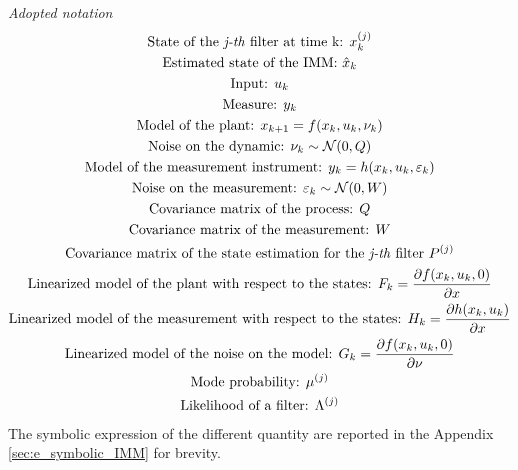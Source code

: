 \textit{Adopted notation}\\
\begin{gather}
  \text{State of the \textit{j-th} filter at time k: } x^{(j)}_{k}  \\
  \text{Estimated state of the IMM: } \hat{x}_{k}\\
  \text{Input: } u_{k} \\
  \text{Measure: } y_{k} \\
  \text{Model of the plant: }  x_{k+1} = f(x_k, u_k, \nu_k) \\
  \text{Noise on the dynamic: } \nu_k \sim \mathcal{N}(0, Q) \\ \label{eq:noise_Q}
  \text{Model of the measurement instrument: } y_k = h(x_k, u_k, \varepsilon_k) \\
  \text{Noise on the measurement: } \varepsilon_k \sim \mathcal{N}(0, W)  \\
  \text{Covariance matrix of the process: } Q\\
  \text{Covariance matrix of the measurement: } W \\
  \text{Covariance matrix of the state estimation for the \textit{j-th} filter } P^{(j)}\\
  \text{Linearized model of the plant with respect to the states: } F_k = \frac{\partial f(x_k, u_k, 0)}{\partial x}\\
  \text{Linearized model of the measurement with respect to the states: } H_k = \frac{\partial h(x_k, u_k)}{\partial x}\\
  \text{Linearized model of the noise on the model: } G_k = \frac{\partial f(x_k, u_k, 0)}{\partial \nu}\\
  \text{Mode probability: } \mu^{(j)}\\
  \text{Likelihood of a filter: } \Lambda^{(j)}
\end{gather}
The symbolic expression of the different quantity are reported in the Appendix \autoref{sec:e_symbolic_IMM} for brevity.

